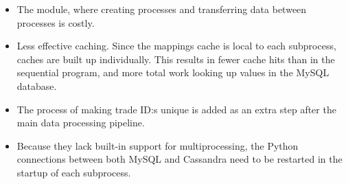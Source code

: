 \begin{itemize}
  \item The  module, where creating processes and transferring data between processes is costly.
  \item Less effective caching. Since the mappings cache is local to each subprocess, caches are built up individually. This results in fewer cache hits than in the sequential program, and more total work
    looking up values in the MySQL database.
  \item The process of making trade ID:s unique is added as an extra step after the main data processing pipeline.
  \item Because they lack built-in support for multiprocessing, the Python connections between both MySQL and Cassandra need to be restarted in the startup of each subprocess.
\end{itemize}

